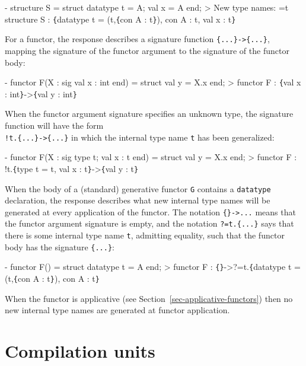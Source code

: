 \documentclass[fleqn,a4paper]{article}
\begin{document}
\begin{program}
- structure S = struct datatype t = A; val x = A end;
> New type names: =t
  structure S : \verb+{+datatype t = (t,\verb+{+con A : t\verb+}+), con A : t, val x : t\verb+}+
\end{program}

\noindent 
For a functor, the response describes a signature function
\verb+{...}->{...}+, mapping the signature of the functor argument to
the signature of the functor body:

\begin{program}
- functor F(X : sig val x : int end) = struct val y = X.x end;
> functor F : \verb+{+val x : int\verb+}+->\verb+{+val y : int\verb+}+
\end{program}

\noindent When the functor argument signature specifies an unknown
type, the signature function will have the form\\ \verb+!t.{...}->{...}+
in which the internal type name \texttt{t} has been generalized:

\begin{program}
- functor F(X : sig type t; val x : t end) = struct val y = X.x end;
> functor F : !t.\verb+{+type t = t, val x : t\verb+}+->\verb+{+val y : t\verb+}+
\end{program}

\noindent When the body of a (standard) generative functor \texttt{G}
contains a \texttt{datatype} declaration, the response describes what
new internal type names will be generated at every application of the
functor.  The notation \verb+{}->...+ means that the functor argument
signature is empty, and the notation \verb+?=t.{...}+ says that there
is some internal type name \verb+t+, admitting equality, such that
the functor body has the signature \verb+{...}+:

\begin{program}
- functor F() = struct datatype t = A end;
> functor F : \verb+{+\verb+}+->?=t.\verb+{+datatype t = (t,\verb+{+con A : t\verb+}+), con A : t\verb+}+
\end{program}

\noindent When the functor is applicative (see
Section~\ref{sec-applicative-functors}) then no new internal type
names are generated at functor application.

\newpage
\section{Compilation units}
\label{sec-compilation-units}
\end{document}
